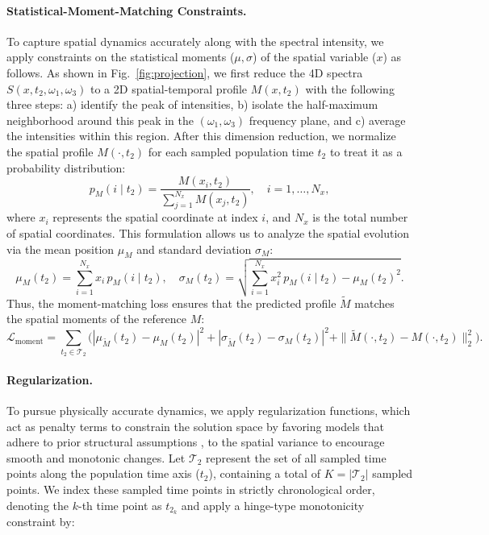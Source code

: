 \documentclass{optica-article}
\begin{document}
\paragraph{Statistical-Moment-Matching Constraints.}
To capture spatial dynamics accurately along with the spectral intensity, we apply constraints on the statistical moments ($\mu, \sigma$) of the spatial variable ($x$) as follows. As shown in Fig.~\ref{fig:projection}, we first reduce the 4D spectra $S(x, t_2, \omega_1, \omega_3)$ to a 2D spatial-temporal profile $M(x, t_2)$ with the following three steps: a) identify the peak of intensities, b) isolate the half-maximum neighborhood around this peak in the $(\omega_1, \omega_3)$ frequency plane, and c) average the intensities within this region. After this dimension reduction, we normalize the spatial profile $M(\cdot, t_2)$ for each sampled population time $t_2$ to treat it as a probability distribution:
\begin{equation}
    p_M(i \mid t_2) = \frac{M(x_i, t_2)}{\sum_{j=1}^{N_x} M(x_j, t_2)}, \quad i=1, \dots, N_x,
\end{equation}
where $x_i$ represents the spatial coordinate at index $i$, and $N_x$ is the total number of spatial coordinates. This formulation allows us to analyze the spatial evolution via the mean position $\mu_M$ and standard deviation $\sigma_M$:
\begin{equation}
\label{eq:mean_std}
    \mu_M(t_2) = \sum_{i=1}^{N_x} x_i \, p_M(i \mid t_2), 
    \quad 
    \sigma_M(t_2) = \sqrt{\sum_{i=1}^{N_x} x_i^2 \, p_M(i \mid t_2) - \mu_M(t_2)^2}.
\end{equation}
Thus, the moment-matching loss ensures that the predicted profile $\tilde{M}$ matches the spatial moments of the reference $M$:
\begin{equation}
    \mathcal{L}_{\mathrm{moment}} = \sum_{t_2 \in \mathcal{T}_2} \Big( 
    |\mu_{\tilde{M}}(t_2) - \mu_M(t_2)|^2 
    + |\sigma_{\tilde{M}}(t_2) - \sigma_M(t_2)|^2 
    + \|\tilde{M}(\cdot, t_2) - M(\cdot, t_2)\|_2^2 
    \Big).
\end{equation}

\paragraph{Regularization.}
To pursue physically accurate dynamics, we apply regularization functions, which act as penalty terms to constrain the solution space by favoring models that adhere to prior structural assumptions \cite{willoughby1979solutions, aster2018parameter}, to the spatial variance to encourage smooth and monotonic changes. Let $\mathcal{T}_2$ represent the set of all sampled time points along the population time axis ($t_2$), containing a total of $K = |\mathcal{T}_2|$ sampled points. We index these sampled time points in strictly chronological order, denoting the $k$-th time point as $t_{2_k}$ and apply a hinge-type monotonicity constraint by:
\end{document}
